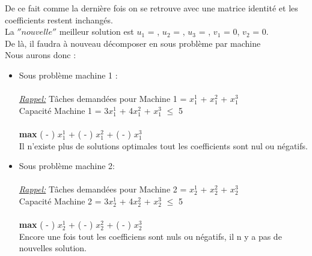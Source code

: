 De ce fait comme la dernière fois on se retrouve avec une matrice identité et les coefficients restent inchangés. \\
La \textit{$''nouvelle''$} meilleur solution est \textit{$u_1$} = ,  \textit{$u_2$} = , \textit{$u_3$} = , \textit{$v_1$} = 0, \textit{$v_2$} = 0.    
\\
De là, il faudra à nouveau décomposer en sous problème par machine
\\
Nous aurons donc : 
\\
\begin{itemize}
\item{
Sous problème machine 1 : \\ \\ 
\textit{\underline{Rappel:}}  Tâches demandées pour Machine 1 =  $x_1^1$ + $x_1^2$ + $x_1^3$  \\ 
Capacité Machine 1 = 3$x_1^1$ + 4$x_1^2$ + $x_1^3$ $\leq$ 5
\\ \\ 
\textbf{max} (  -  ) $x_1^1$ + ( -  ) $x_1^2$ + ( -  ) $x_1^3$
\\
 Il n'existe plus de solutions optimales tout les coefficients sont nul ou négatifs. 
 \\

}

\item{
Sous problème machine 2: 
\\
\\
\textit{\underline{Rappel:}}  Tâches demandées pour Machine 2 =  $x_2^1$ + $x_2^2$ + $x_2^3$  \\ 
Capacité Machine 2 = 3$x_2^1$ + 4$x_2^2$ + $x_2^3$ $\leq$ 5
\\ \\ 
\textbf{max} (  -  ) $x_2^1$ + ( -  ) $x_2^2$ + ( - ) $x_2^3$
\\
Encore une fois tout les coefficiens sont nuls ou négatifs, il n y a pas de nouvelles solution.
}
\end{itemize}

